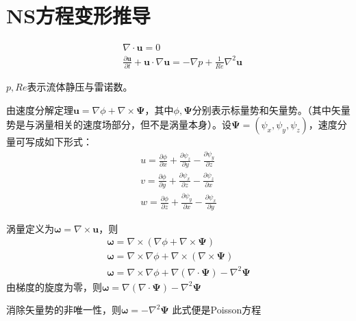 
\section{NS方程变形推导}

\begin{align}
    &\nabla\cdot\mathbf{u}=0\\
    &\frac{\partial \mathbf{u}}{\partial t}+\mathbf{u}\cdot\nabla \mathbf{u}=-\nabla p+\frac{1}{Re}\nabla^{2}\mathbf{u}
\end{align}

$p,Re$表示流体静压与雷诺数。

由速度分解定理$\mathbf{u}=\nabla \phi+\nabla \times \bm{\Psi}$，其中$\phi,\bm{\Psi}$分别表示标量势和矢量势。（其中矢量势是与涡量相关的速度场部分，但不是涡量本身）。设$\bm{\Psi}=(\psi_{x},\psi_{y},\psi_{z})$，速度分量可写成如下形式：
\begin{align}
    u=\frac{\partial \phi}{\partial x}+\frac{\partial \psi_{z}}{\partial y}-\frac{\partial \psi_{y}}{\partial z}\\
    v=\frac{\partial \phi}{\partial y}+\frac{\partial \psi_{x}}{\partial z}-\frac{\partial \psi_{z}}{\partial x}\\
    w=\frac{\partial \phi}{\partial z}+\frac{\partial \psi_{y}}{\partial x}-\frac{\partial \psi_{x}}{\partial y}
\end{align}

涡量定义为$\bm{\omega}=\nabla\times\bm{u}$，则
\begin{align*}
    \bm{\omega}=\nabla\times(\nabla \phi+\nabla \times \bm{\Psi})\\
     \bm{\omega}=\nabla\times\nabla \phi+\nabla\times(\nabla \times \bm{\Psi})\\
     \bm{\omega}=\nabla\times\nabla \phi+\nabla(\nabla\cdot\bm{\Psi})-\nabla^{2}\bm{\Psi}
\end{align*}
由梯度的旋度为零，则$\bm{\omega}=\nabla(\nabla\cdot\bm{\Psi})-\nabla^{2}\bm{\Psi}$

消除矢量势的非唯一性，则$\bm{\omega}=-\nabla^{2}\bm{\Psi}$
此式便是Poisson方程

